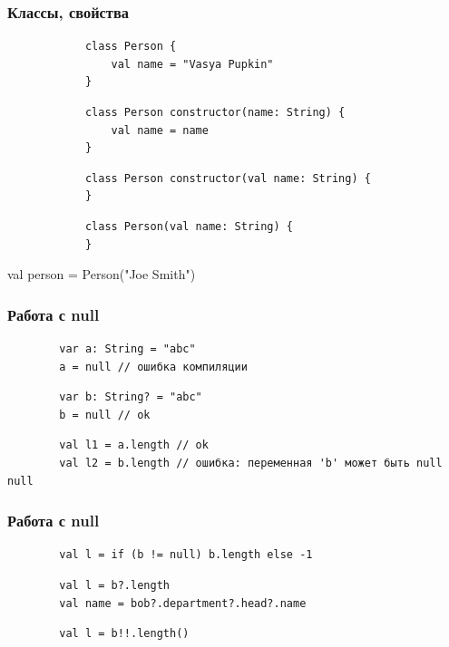 \documentclass{beamer}
\begin{document}
\begin{frame}[fragile, t]
    \frametitle{Классы, свойства}
    \begin{overprint}
        \begin{verbatim}
            class Person {
                val name = "Vasya Pupkin"
            }
        \end{verbatim}

        \begin{verbatim}
            class Person constructor(name: String) {
                val name = name
            }
        \end{verbatim}

        \begin{verbatim}
            class Person constructor(val name: String) {
            }
        \end{verbatim}

        \begin{verbatim}
            class Person(val name: String) {
            }
        \end{verbatim}
        val person = Person("Joe Smith")
    \end{overprint}
\end{frame}

\begin{frame}[fragile, t]
    \frametitle{Работа с null}
    \begin{verbatim}
        var a: String = "abc"
        a = null // ошибка компиляции
    \end{verbatim}
    \begin{verbatim}
        var b: String? = "abc"
        b = null // ok
    \end{verbatim}
    \begin{verbatim}
        val l1 = a.length // ok
        val l2 = b.length // ошибка: переменная 'b' может быть null null
    \end{verbatim}
\end{frame}

\begin{frame}[fragile, t]
    \frametitle{Работа с null}
    \begin{verbatim}
        val l = if (b != null) b.length else -1
    \end{verbatim}

    \begin{verbatim}
        val l = b?.length
        val name = bob?.department?.head?.name
    \end{verbatim}

    \begin{verbatim}
        val l = b!!.length()
    \end{verbatim}
\end{frame}
\end{document}

